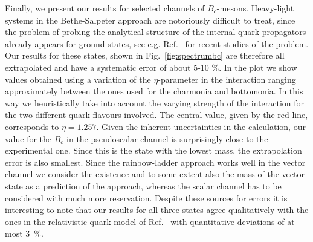 Finally, we present our results for selected channels of $B_c$-mesons. 
Heavy-light systems in the Bethe-Salpeter
approach are notoriously difficult to treat, since the problem of probing the analytical
structure of the internal quark propagators already appears for ground states, see e.g.
Ref.~\cite{Rojas:2014aka,Gomez-Rocha:2014vsa} for recent studies of the problem. Our results for these states,
shown in Fig.~\ref{fig:spectrumbc} are therefore all extrapolated and have a systematic error
of about 5-10 \%. In the plot we show values obtained using a variation of the $\eta$-parameter
in the interaction ranging approximately between the ones used for the charmonia and bottomonia.
In this way we heuristically take into account the varying strength of the interaction for the
two different quark flavours involved. The central value, given by the red line, corresponds 
to $\eta=1.257$. Given the inherent uncertainties in the calculation, our value for the $B_c$
in the pseudoscalar channel is surprisingly close to the experimental one. Since this is the
state with the lowest mass, the extrapolation error is also smallest. Since the rainbow-ladder
approach works well in the vector channel we consider the existence and to some extent also the 
mass of the vector state as a prediction of the approach, whereas the scalar channel has to
be considered with much more reservation. Despite these sources for errors it is interesting to
note that our results for all three states agree qualitatively with the ones in the relativistic 
quark model of Ref.~\cite{Ebert:2011jc} with quantitative deviations of at most 3~\%.

